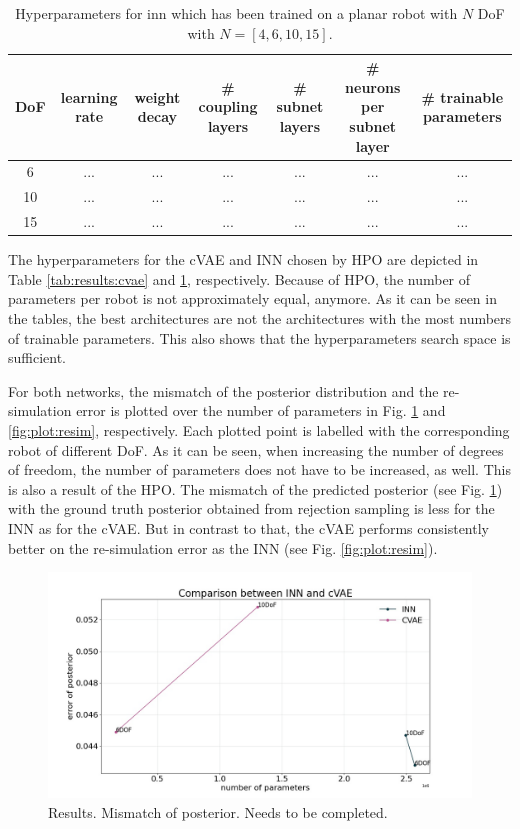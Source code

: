 \documentclass[conference]{IEEEtran}
\begin{document}
\begin{table}[h]
\centering
\begin{tabular}{|c|c|c|c|c|c|c|}
\hline
 DoF & learning rate & weight decay & \# coupling layers & \# subnet layers & \# neurons per subnet layer &  \# trainable parameters\\
 \hline
 6  & ... & ...& ... & ... & ... & ...\\
 10  & ... & ... & ... & ... & ... & ...\\
 15  & ... & ... & ... & ... & ... & ...\\
 \hline
\end{tabular}
\vspace{5pt}
\caption{\label{tab:results:inn}  Hyperparameters for inn which has been trained on a planar robot with $N$ DoF with $N=[4, 6, 10, 15]$.}
\end{table}

The hyperparameters for the cVAE and INN chosen by HPO are depicted in Table \ref{tab:results:cvae} and \ref{tab:results:inn}, respectively. Because of HPO, the number of parameters per robot is not approximately equal, anymore. As it can be seen in the tables, the best architectures are not the architectures with the most numbers of trainable parameters. This also shows that the hyperparameters search space is sufficient. 

For both networks, the mismatch of the posterior distribution and the re-simulation error is plotted over the number of parameters in Fig. \ref{fig:plot:posterior} and \ref{fig:plot:resim}, respectively. Each plotted point is labelled with the corresponding robot of different DoF. As it can be seen, when increasing the number of degrees of freedom, the number of parameters does not have to be increased, as well. This is also a result of the HPO. 
The mismatch of the predicted posterior (see Fig. \ref{fig:plot:posterior}) with the ground truth posterior obtained from rejection sampling is less for the INN as for the cVAE. But in contrast to that, the cVAE performs consistently better on the re-simulation error as the INN (see Fig. \ref{fig:plot:resim}).

\begin{figure}[!ht]
\centering
	\includegraphics[width=\linewidth]{figures/comparison_e_posterior_alternative.jpg}
    \caption{\label{fig:plot:posterior} Results. Mismatch of posterior. Needs to be completed.}
\end{figure}
\end{document}
